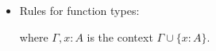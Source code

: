 \begin{itemize}
    \item Rules for function types:
    \begin{center}
      \vspace{0pt}  
      \begin{minipage}[t]{5cm}
        \vspace{0pt}  
        \begin{prooftree}
        \end{prooftree}
      \end{minipage}
      \begin{minipage}[t]{5cm}
        \vspace{0pt}
        \begin{prooftree}
        \end{prooftree}
      \end{minipage}
    \end{center}
where $\Gamma , x : A$ is the context $\Gamma \cup \{x : A\}$.

\end{itemize}
\nocite{*}




